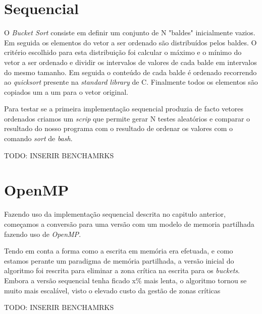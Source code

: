\documentclass[a4paper]{report}
\begin{document}
\chapter{Sequencial}
O \textit{Bucket Sort} consiste em definir um conjunto de N "baldes"
inicialmente vazios. Em seguida os elementos do vetor a ser ordenado são
distribuídos pelos baldes. O critério escolhido para esta distribuição foi
calcular o máximo e o mínimo do vetor a ser ordenado e dividir os intervalos de
valores de cada balde em intervalos do mesmo tamanho. Em seguida o conteúdo de
cada balde é ordenado recorrendo ao \textit{quicksort} presente na
\textit{standard library} de C. Finalmente todos os elementos são copiados um a
um para o vetor original.

Para testar se a primeira implementação sequencial produzia de facto vetores
ordenados criamos um \textit{scrip} que permite gerar N testes aleatórios e
comparar o resultado do nosso programa com o resultado de ordenar os valores
com o comando \textit{sort} de \textit{bash}.

TODO: INSERIR BENCHAMRKS

\chapter{OpenMP}
Fazendo uso da implementação sequencial descrita no capitulo anterior, começamos
a conversão para uma versão com um modelo de memoria partilhada fazendo uso de
\textit{OpenMP}.

Tendo em conta a forma como a escrita em memória era efetuada, e como estamos
perante um paradigma de memória partilhada, a versão inicial do algoritmo foi
rescrita para eliminar a zona crítica na escrita para os \textit{buckets}.
Embora a versão sequencial tenha ficado x\% mais lenta, o algoritmo tornou se
muito mais escalável, visto o elevado custo da gestão de zonas críticas

TODO: INSERIR BENCHAMRKS
\end{document}
